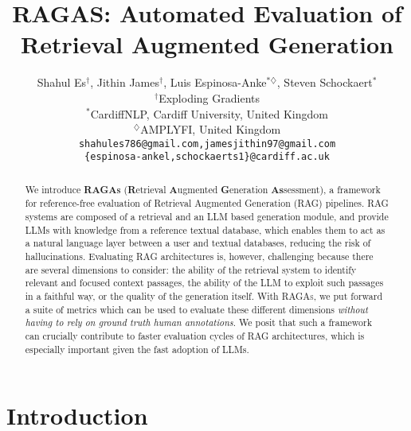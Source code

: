 \documentclass[11pt]{article}
\title{RAGAS: Automated Evaluation of Retrieval Augmented Generation}
\author{Shahul Es$^{\dagger}$, Jithin James$^{\dagger}$, Luis Espinosa-Anke$^{*\diamondsuit}$, Steven Schockaert$^{*}$ \\
        $^{\dagger}$Exploding Gradients \\ 
         $^{*}$CardiffNLP, Cardiff University, United Kingdom \\ 
         $^{\diamondsuit}$AMPLYFI, United Kingdom\\ 
         \texttt{shahules786@gmail.com,jamesjithin97@gmail.com}\\ 
         \texttt{\{espinosa-ankel,schockaerts1\}@cardiff.ac.uk}}
\begin{document}
\maketitle
\begin{abstract}
We introduce \textsc{\textbf{RAGAs}} (\textbf{R}etrieval \textbf{A}ugmented \textbf{G}eneration \textbf{As}sessment), a framework for reference-free evaluation of Retrieval Augmented Generation (RAG) pipelines. RAG systems are composed of a retrieval and an LLM based generation module, and provide LLMs with knowledge from a reference textual database, which enables them to act as a natural language layer between a user and textual databases, reducing the risk of hallucinations. Evaluating RAG architectures is, however, challenging because there are several dimensions to consider: the ability of the retrieval system to identify relevant and focused context passages, the ability of the LLM to exploit such passages in a faithful way, or the quality of the generation itself. With \textsc{RAGAs}, we put forward a suite of metrics which can be used to evaluate these different dimensions \textit{without having to rely on ground truth human annotations}. We posit that such a framework can crucially contribute to faster evaluation cycles of RAG architectures, which is especially important given the fast adoption of LLMs.

\end{abstract}

\section{Introduction}
\end{document}
